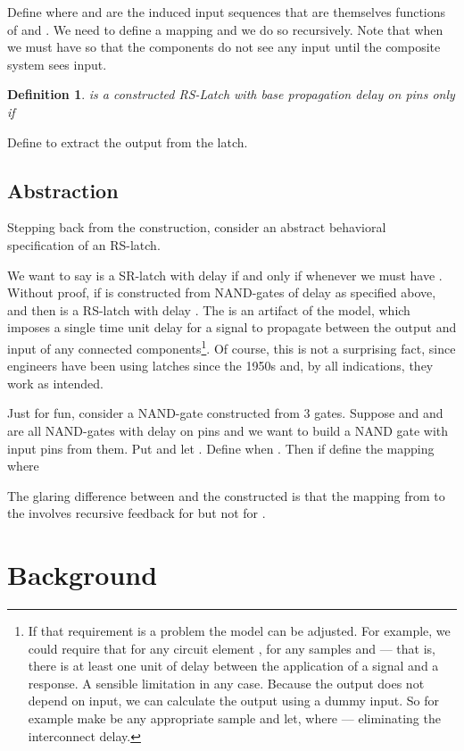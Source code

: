 \documentclass[runningheads,letter]{llncs}
\newtheorem{dfn}{Definition}[section]
\begin{document}
Define  
where  and  are the induced input sequences that are themselves
functions of  and . We need to define a mapping  and
we do so recursively. Note that when  we must have  so that
the components do not see any input until the composite system sees input.

\begin{dfn}  is a constructed RS-Latch with base propagation delay 
on pins  only if

\end{dfn}

Define  to extract the  output from the latch.

\subsection{Abstraction}
Stepping back from the construction, consider an abstract behavioral specification of an RS-latch.



We want to say  is a SR-latch with delay  if and only if
whenever  we must have .
Without proof, if  is constructed from NAND-gates of delay  as specified above, and  then
 is a RS-latch with delay . The  is an artifact of the model, which imposes a single
time unit delay for a signal to propagate between the output and input of any connected components\footnote{ 
If that requirement is a problem the model can be adjusted. For example, we could require that for any circuit element ,  for any
samples  and  --- that is, there is at least one unit of delay between
the application of a signal and a response. A sensible limitation in any case.
Because the output does not depend on input, we can calculate the output using a dummy input.
So for example make  be any appropriate sample and let,  where 
--- eliminating the interconnect delay.}.
Of course, this is not a surprising fact,
since engineers have been using latches since the 1950s and, by all indications, they work as intended.

Just for fun, consider a NAND-gate constructed from 3 gates. Suppose  and 
 and  are all NAND-gates with delay  on pins  and 
we want to build a NAND gate with input pins  from them.
Put  and let . 
Define  when . Then if
 define the mapping 
where 


The glaring difference between  and the constructed  is that the
mapping from  to the  involves recursive feedback for  but not
for .

\section{Background\label{sec:back}}
\end{document}
